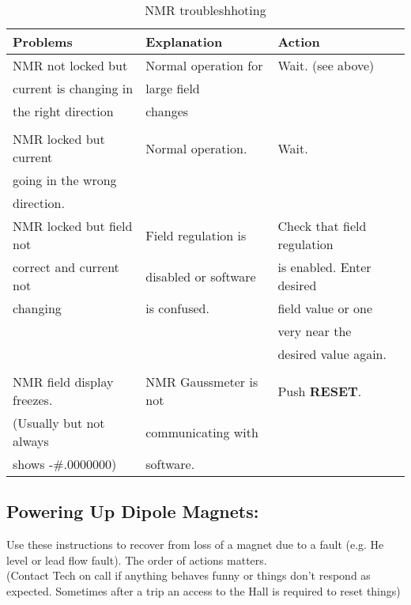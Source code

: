 {\begin{table}[ht]
\begin{center}
\begin{tabular}{|l|l|l|}\hline
Problems & Explanation & Action \\ \hline
NMR not locked but  & Normal operation for  & Wait. (see 
above) \\ 
current is changing in & large field & \\ 
the right direction & changes  & \\
 && \\ \hline
NMR locked but current & Normal operation. & Wait. \\
going in the wrong & & \\
direction. & & \\ \hline
NMR locked but field not & Field regulation is & Check 
that field regulation \\
correct and current not & disabled  or software & is enabled.  Enter 
desired \\
changing & is confused. & field value or one \\
&& very near the \\
&& desired value again. \\ 
  &  & \\
\hline
NMR field display freezes. & NMR Gaussmeter is not & Push {\bf RESET}. \\
(Usually but not always & communicating with &  \\
shows  -\#.0000000) & software. & \\ \hline
\end{tabular}
\end{center}
\caption[NMR troubleshhoting]{NMR troubleshhoting
}
\label{tab:hrs_nmr_2}
\end{table}

\subsection{Powering Up Dipole Magnets:}
\noindent
Use these instructions to recover from loss of a magnet due to a fault
(e.g. He level or lead flow fault). The order of actions matters. \\
(Contact Tech on call if anything behaves funny or things don't
respond as expected. Sometimes after a trip an access to the Hall is
required to reset things)\\

}

